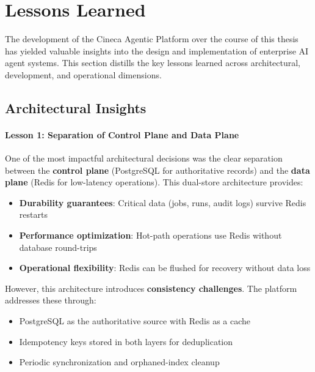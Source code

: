 
\section{Lessons Learned}
\label{sec:lessons}

The development of the Cineca Agentic Platform over the course of this thesis has yielded valuable insights into the design and implementation of enterprise AI agent systems. This section distills the key lessons learned across architectural, development, and operational dimensions.

\subsection{Architectural Insights}

\paragraph{Lesson 1: Separation of Control Plane and Data Plane}

One of the most impactful architectural decisions was the clear separation between the \textbf{control plane} (PostgreSQL for authoritative records) and the \textbf{data plane} (Redis for low-latency operations). This dual-store architecture provides:

\begin{itemize}
    \item \textbf{Durability guarantees}: Critical data (jobs, runs, audit logs) survive Redis restarts
    \item \textbf{Performance optimization}: Hot-path operations use Redis without database round-trips
    \item \textbf{Operational flexibility}: Redis can be flushed for recovery without data loss
\end{itemize}

However, this architecture introduces \textbf{consistency challenges}. The platform addresses these through:
\begin{itemize}
    \item PostgreSQL as the authoritative source with Redis as a cache
    \item Idempotency keys stored in both layers for deduplication
    \item Periodic synchronization and orphaned-index cleanup
\end{itemize}

